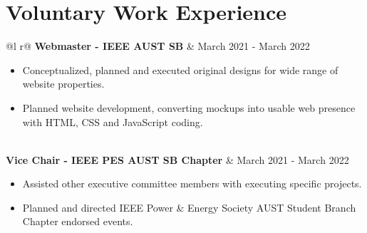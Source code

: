 \documentclass[a4paper,12pt]{article}
\begin{document}
\section{Voluntary Work Experience}
\begin{tabularx}{\linewidth}{ @{}l r@{} }
\textbf{Webmaster - IEEE AUST SB} & \hfill March 2021 - March 2022\\[3.75pt]
{\begin{itemize}
    \item Conceptualized, planned and executed original designs for wide range of website properties.
    \item Planned website development, converting mockups into usable web presence with HTML, CSS and JavaScript coding.
    
\end{itemize}}  \\
\textbf{Vice Chair - IEEE PES AUST SB Chapter} & \hfill March 2021 - March 2022\\[3.75pt]
{\begin{itemize}
    \item Assisted other executive committee members with executing specific projects.
    \item Planned and directed IEEE Power \& Energy Society AUST Student Branch Chapter endorsed events.

\end{itemize}}  \\
   

\end{tabularx}

\vfill
{}
\end{document}
